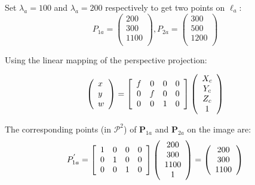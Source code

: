 \begin{questions}
\begin{parts}
\begin{solution}
  Set $\lambda_a=100$ and $\lambda_a=200$ respectively to get two points on $\ell_a$:
  \[ P_{1a} = \left(\begin{array}{c}200 \\ 300 \\ 1100 \\ \end{array} \right), P_{2a} = \left(\begin{array}{c}300 \\ 500 \\ 1200 \\ \end{array} \right) \]
  
  Using the linear mapping of the perspective projection:
  
  \begin{equation}
  \left( \begin{array} { l } { x } \\ { y } \\ { w } \end{array} \right) = \left[ \begin{array} { c c c c } { f } & { 0 } & { 0 } & { 0 } \\ { 0 } & { f } & { 0 } & { 0 } \\ { 0 } & { 0 } & { 1 } & { 0 } \end{array} \right] \left( \begin{array} { c } { X _ { c } } \\ { Y _ { c } } \\ { Z _ { c } } \\ { 1 } \end{array} \right)
  \end{equation}
  
  The corresponding points (in $\mathcal{P}^2$) of $\mathbf{P}_{1a}$ and $\mathbf{P}_{2a}$ on the image are:
  \[ P^{'}_{1a} = \left[ \begin{array} { c c c c } { 1 } & { 0 } & { 0 } & { 0 } \\ { 0 } & { 1 } & { 0 } & { 0 } \\ { 0 } & { 0 } & { 1 } & { 0 } \end{array} \right] \left( \begin{array} { c } { 200 } \\ { 300 } \\ { 1100 } \\ { 1 } \end{array} \right) = \left(\begin{array}{c}200 \\ 300 \\ 1100 \\ \end{array} \right) \]
  

\end{solution}
\end{parts}
\end{questions}
